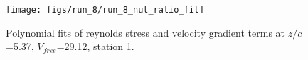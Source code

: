 \begin{figure}[H]
\centering
\texttt{[image: figs/run\_8/run\_8\_nut\_ratio\_fit]}
\caption{Polynomial fits of reynolds stress and velocity gradient terms at $z/c$=5.37, $V_{free}$=29.12, station 1.}
\label{fig:run_8_nut_ratio_fit}
\end{figure}


